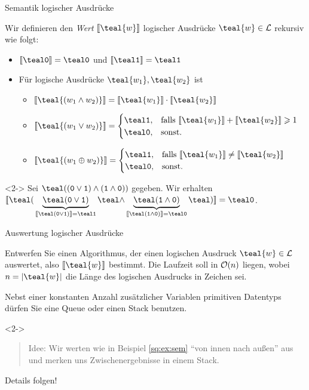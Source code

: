 \begin{frame}{Semantik logischer Ausdr\"ucke}
\begin{definition}
Wir definieren den \emph{Wert} $\llbracket \teal{w} \rrbracket$ logischer Ausdr\"ucke $\teal{w} \in \mathcal{L}$ rekursiv wie folgt:
\begin{itemize}
    \item $\eval{\logic{0}} = \logic{0}$ und $\eval{\logic{1}} = \logic{1}$
    \item F\"ur logische Ausdr\"ucke $\teal{w_1}, \teal{w_2}$ ist
    \begin{itemize}
        \item $\eval{\teal{(w_1 \land w_2)}} = \eval{\teal{w_1}} \cdot \eval{\teal{w_2}}$
        \item $\eval{\teal{(w_1 \lor w_2)}} = \begin{cases}\logic{1}, & \text{falls } \eval{\teal{w_1}} + \eval{\teal{w_2}} \geq 1 \\ \logic{0}, & \text{sonst.}\end{cases}$
        \item $\eval{\teal{(w_1 \oplus w_2)}} = \begin{cases}\logic{1}, & \text{falls } \eval{\teal{w_1}} \neq \eval{\teal{w_2}} \\ \logic{0}, & \text{sonst.}\end{cases}$
    \end{itemize}
\end{itemize}
\end{definition}
\begin{example}<2->\label{sq:ex:sem}
Sei $\logic{((0 \lor 1) \land (1 \land 0))}$ gegeben.
Wir erhalten $\eval{
\logic{(}
\underbrace{\logic{(0 \lor 1)}}_{\eval{\logic{(0 \lor 1)}} = \logic{1}}
\logic{\land}
\underbrace{\logic{(1 \land 0)}}_{\eval{\logic{(1 \land 0)}} = \logic{0}}
\logic{)}
} = \logic{0}$.
\end{example}
\end{frame}

\begin{frame}{Auswertung logischer Ausdr\"ucke}
\begin{task}
Entwerfen Sie einen Algorithmus, der einen logischen Ausdruck $\teal{w} \in \mathcal{L}$ auswertet, also $\eval{\teal{w}}$ bestimmt.
Die Laufzeit soll in $\mathcal{O}(n)$ liegen, wobei $n = |\teal{w}|$ die L\"ange des logischen Ausdrucks in Zeichen sei.

Nebst einer konstanten Anzahl zus\"atzlicher Variablen primitiven Datentyps d\"urfen Sie eine Queue oder einen Stack benutzen.
\end{task}
\begin{solution}<2->
\begin{quote}
    Idee: Wir werten  wie in Beispiel \ref{sq:ex:sem} ``von innen nach au{\ss}en'' aus und merken uns Zwischenergebnisse in einem \alert{Stack}.
\end{quote}

Details folgen!
\end{solution}
\end{frame}